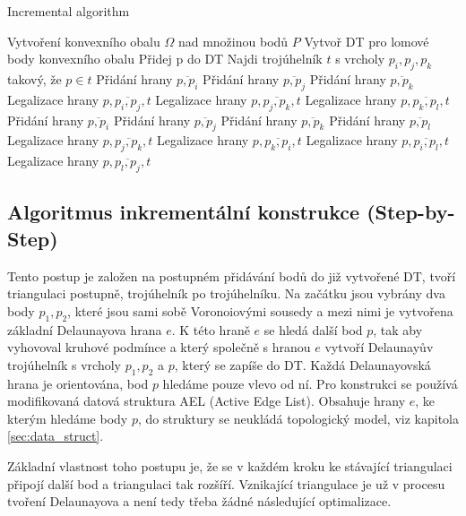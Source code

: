 \documentclass[12pt,a4paper]{article}
\begin{document}
\begin{algorithm}
\caption{Incremental algorithm}
\begin{algorithmic}[1]
\State Vytvoření konvexního obalu $\Omega$ nad množinou bodů $P$
\State Vytvoř DT pro lomové body konvexního obalu
	\State Přidej p do DT
	\State Najdi trojúhelník $t$ s vrcholy $p_i, p_j, p_k$ takový, že $p \in t$
		\State Přidání hrany $\overline{p,p_i}$
		\State Přidání hrany $\overline{p,p_j}$
		\State Přidání hrany $\overline{p,p_k}$
		\State Legalizace hrany $p,\overline{p_i,p_j},t$
		\State Legalizace hrany $p,\overline{p_j,p_k},t$
		\State Legalizace hrany $p,\overline{p_k,p_l},t$
		\State Přidání hrany $\overline{p,p_i}$
		\State Přidání hrany $\overline{p,p_j}$
		\State Přidání hrany $\overline{p,p_k}$
		\State Přidání hrany $\overline{p,p_l}$
		\State Legalizace hrany $p,\overline{p_j,p_k},t$
		\State Legalizace hrany $p,\overline{p_k,p_i},t$
		\State Legalizace hrany $p,\overline{p_i,p_l},t$
		\State Legalizace hrany $p,\overline{p_l,p_j},t$
	\EndIf
\EndFor
\end{algorithmic}
\end{algorithm}

\newpage
\subsection{Algoritmus inkrementální konstrukce (Step-by-Step)}

Tento postup je založen na postupném přidávání bodů do již vytvořené DT, tvoří triangulaci postupně, trojúhelník po trojúhelníku. Na začátku jsou vybrány dva body $p_1, p_2$, které jsou sami sobě Voronoiovými sousedy a mezi nimi je vytvořena základní Delaunayova hrana $e$. K této hraně $e$ se hledá další bod 	$p$, tak aby vyhovoval kruhové podmínce a který společně s hranou $e$ vytvoří Delaunayův trojúhelník s vrcholy $p_1, p_2$ a $p$, který se zapíše do DT. Každá Delaunayovská hrana je orientována, bod $p$ hledáme pouze vlevo od ní. Pro konstrukci se používá modifikovaná datová struktura AEL (Active Edge List). Obsahuje hrany $e$, ke kterým hledáme body $p$, do struktury se neukládá topologický model, viz kapitola \ref{sec:data_struct}.

Základní vlastnost toho postupu je, že se v každém kroku ke stávající triangulaci připojí další bod a triangulaci tak rozšíří. Vznikající triangulace je už v procesu tvoření Delaunayova a není tedy třeba žádné následující optimalizace.
\end{document}
